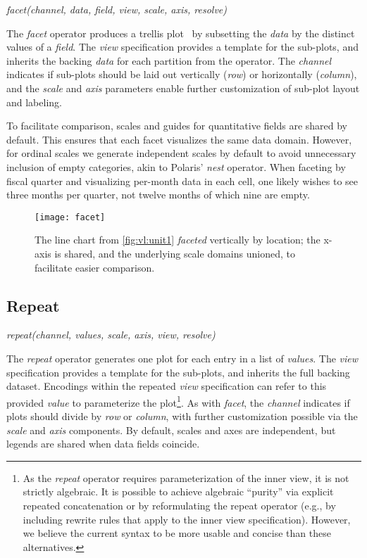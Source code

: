 \centerline{
  \emph{facet(channel, data, field, view, scale, axis, resolve)}
}


The \emph{facet} operator produces a trellis plot~\cite{becker:trellis} by
subsetting the \emph{data} by the distinct values of a \emph{field}. The
\emph{view} specification provides a template for the sub-plots, and inherits
the backing \emph{data} for each partition from the operator. The \emph{channel}
indicates if sub-plots should be laid out vertically (\emph{row}) or
horizontally (\emph{column}), and the \emph{scale} and \emph{axis} parameters
enable further customization of sub-plot layout and labeling.

To facilitate comparison, scales and guides for quantitative fields are shared
by default. This ensures that each facet visualizes the same data domain.
However, for ordinal scales we generate independent scales by default to avoid
unnecessary inclusion of empty categories, akin to Polaris' \emph{nest}
operator. When faceting by fiscal quarter and visualizing per-month data in
each cell, one likely wishes to see three months per quarter, not twelve
months of which nine are empty.

\begin{figure*}[h!]
  \centering
  \texttt{[image: facet]}
  \caption{The line chart from \cref{fig:vl:unit1} \emph{faceted}
  vertically by location; the x-axis is shared, and the underlying scale domains
  unioned, to facilitate easier comparison.}
  \label{fig:vl:facet}
\end{figure*}

\subsection{Repeat}

\centerline{
  \emph{repeat(channel, values, scale, axis, view, resolve)}
}

The \emph{repeat} operator generates one plot for each entry in a list of
\emph{values}. The \emph{view} specification provides a template for the
sub-plots, and inherits the full backing dataset. Encodings within the
repeated \emph{view} specification can refer to this provided \emph{value} to
parameterize the plot\footnote{As the \emph{repeat} operator requires
parameterization of the inner view, it is not strictly algebraic. It is
possible to achieve algebraic ``purity'' via explicit repeated concatenation
or by reformulating the repeat operator (e.g., by including rewrite rules that
apply to the inner view specification). However, we believe the current syntax
to be more usable and concise than these alternatives.}. As with \emph{facet},
the \emph{channel} indicates if plots should divide by \emph{row} or
\emph{column}, with further customization possible via the \emph{scale} and
\emph{axis} components. By default, scales and axes are independent, but
legends are shared when data fields coincide.

